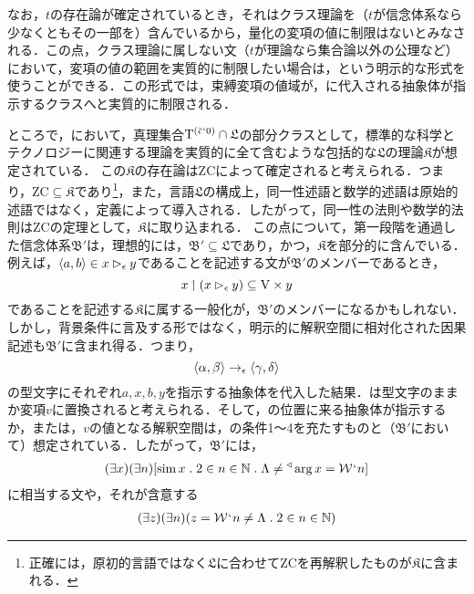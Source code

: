 なお，$t$の存在論が確定されているとき，それはクラス理論を（$t$が信念体系なら少なくともその一部を）含んでいるから，量化の変項の値に制限はないとみなされる．この点，クラス理論に属しない文（$t$が理論なら集合論以外の公理など）において，変項の値の範囲を実質的に制限したい場合は，という明示的な形式を使うことができる．この形式では，束縛変項の値域が，\kagi{$ \alpha $}に代入される抽象体が指示するクラスへと実質的に制限される．

ところで，において，真理集合$\mathrm{T}^{(\breve{\epsilon}{\mspace{1mu}{`}\mspace{1mu}} 0)}\cap\mathfrak{L}$の部分クラスとして，標準的な科学とテクノロジーに関連する理論を実質的に全て含むような包括的な$\mathfrak{L}$の理論$\mathfrak{K}$が想定されている．
この$\mathfrak{K}$の存在論は$\mathrm{ZC}$によって確定されると考えられる．つまり，$\mathrm{ZC}\subseteq\mathfrak{K}$であり\footnote{正確には，原初的言語ではなく$\mathfrak{L}$に合わせて$\mathrm{ZC}$を再解釈したものが$\mathfrak{K}$に含まれる．}，また，言語$\mathfrak{L}$の構成上，同一性述語と数学的述語は原始的述語ではなく，定義によって導入される．したがって，同一性の法則や数学的法則は$\mathrm{ZC}$の定理として，$\mathfrak{K}$に取り込まれる．
この点について，第一段階を通過した信念体系$ \mathfrak{B}' $は，理想的には，$\mathfrak{B}'\subseteq\mathfrak{L}$であり，かつ，$\mathfrak{K}$を部分的に含んでいる．例えば，$ \langle a,b \rangle\in x\mathbin{\vartriangleright_{\epsilon}}y $であることを記述する文が$ \mathfrak{B}' $のメンバーであるとき，
\[
    x\mathbin{\upharpoonleft}(x\mathbin{\vartriangleright_{\epsilon}}y)\subseteq \mathrm{V}\times y
\]
であることを記述する$\mathfrak{K}$に属する一般化が，$ \mathfrak{B}' $のメンバーになるかもしれない．しかし，背景条件に言及する形ではなく，明示的に解釈空間に相対化された因果記述も$\mathfrak{B}'$に含まれ得る．つまり，
\[
    \langle \alpha,\beta \rangle\to_{\epsilon}\langle \gamma,\delta \rangle
\]
の型文字にそれぞれ$a,x,b,y$を指示する抽象体を代入した結果．\kagi{$ \epsilon $}は型文字のままか変項$v$に置換されると考えられる．そして，\kagi{$ \epsilon $}の位置に来る抽象体が指示するか，または，$v$の値となる解釈空間は，の条件1〜4を充たすものと（$\mathfrak{B}'$において）想定されている．したがって，$\mathfrak{B}'$には，
\setcounter{equation}{0}
\begin{align}
    (\exists x)(\exists n)[\mathrm{sim}\,x\con{1}2\in n\in\mathbb{N}\con{1}\Lambda\neq \trgl{\arg x} = \mathcal{W}\fap n]
\end{align}
に相当する文や，それが含意する
\begin{align}
    (\exists z)(\exists n)(z = \mathcal{W}\fap n\neq\Lambda\con{1}2\in n \in\mathbb{N})
\end{align}
